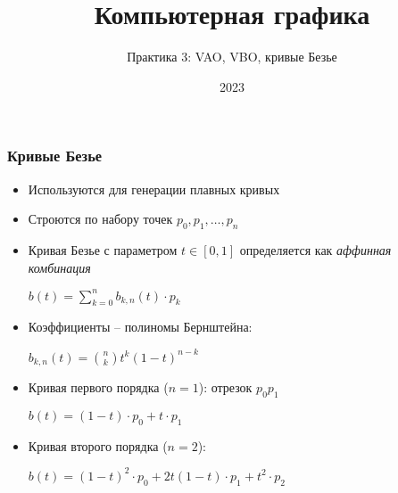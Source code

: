 \documentclass[10pt]{beamer}
\title{Компьютерная графика}
\subtitle{Практика 3: VAO, VBO, кривые Безье}
\date{2023}
\begin{document}
\frame{\titlepage}

\begin{frame}[fragile]
\frametitle{Кривые Безье}
\begin{itemize}
\item Используются для генерации плавных кривых
\pause
\item Строются по набору точек \begin{math}p_0, p_1, \dots, p_n\end{math}
\pause
\item Кривая Безье с параметром \begin{math}t \in [0, 1]\end{math} определяется как \textit{аффинная комбинация}

\begin{center}
\begin{math}
b(t) = \sum\limits_{k=0}^n b_{k,n}(t) \cdot p_k
\end{math}
\end{center}

\pause
\item Коэффициенты -- полиномы Бернштейна:

\begin{center}
\begin{math}
b_{k,n}(t) = \binom{n}{k}t^k(1-t)^{n-k}
\end{math}
\end{center}

\pause
\item Кривая первого порядка (\begin{math}n=1\end{math}): отрезок \begin{math}p_0 p_1\end{math}

\begin{center}
\begin{math}
b(t) = (1-t)\cdot p_0 + t \cdot p_1
\end{math}
\end{center}

\pause
\item Кривая второго порядка (\begin{math}n=2\end{math}):

\begin{center}
\begin{math}
b(t) = (1-t)^2 \cdot p_0 + 2t(1-t) \cdot p_1 + t^2 \cdot p_2
\end{math}
\end{center}

\end{itemize}
\end{frame}
\end{document}
